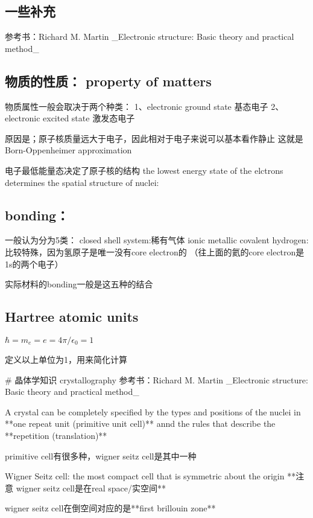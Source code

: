 \documentclass{article}
\begin{document}
\subsection {一些补充}
参考书：Richard M. Martin _Electronic structure: Basic theory and practical method_

\subsection {物质的性质： property of matters}

物质属性一般会取决于两个种类：
1、electronic ground state 基态电子
2、electronic excited state 激发态电子

原因是；原子核质量远大于电子，因此相对于电子来说可以基本看作静止
这就是Born-Oppenheimer approximation

电子最低能量态决定了原子核的结构
the lowest energy state of the elctrons determines the spatial structure of nuclei:

\subsection {bonding：}
一般认为分为5类：
closed shell system:稀有气体
ionic
metallic
covalent
hydrogen:比较特殊，因为氢原子是唯一没有core electron的 （往上面的氦的core electron是1s的两个电子）

实际材料的bonding一般是这五种的结合

\subsection {Hartree atomic units}

$\hbar =m_e = e = 4\pi /\epsilon_0 = 1$

定义以上单位为1，用来简化计算

# 晶体学知识 crystallography
参考书：Richard M. Martin _Electronic structure: Basic theory and practical method_

A crystal can be completely specified by the types and positions of the nuclei in **one repeat unit (primitive unit cell)** annd the rules that describe the **repetition (translation)**

primitive cell有很多种，wigner seitz cell是其中一种

Wigner Seitz cell: the most compact cell that is symmetric about the origin **注意 wigner seitz cell是在real space/实空间** 

wigner seitz cell在倒空间对应的是**first brillouin zone**
\end{document}
